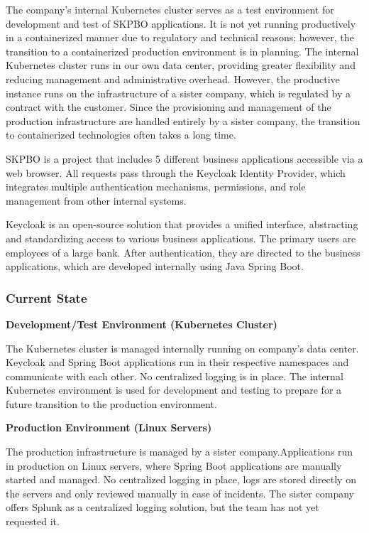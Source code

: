 \documentclass[../main.tex]{subfiles}
\begin{document}
The company's internal Kubernetes cluster serves as a test environment for development and test of SKPBO applications. It is not yet running productively in a containerized manner due to regulatory and technical reasons; however, the transition to a containerized production environment is in planning. The internal Kubernetes cluster runs in our own data center, providing greater flexibility and reducing management and administrative overhead. However, the productive instance runs on the infrastructure of a sister company, which is regulated by a contract with the customer. Since the provisioning and management of the production infrastructure are handled entirely by a sister company, the transition to containerized technologies often takes a long time.

SKPBO is a project that includes 5 different business applications accessible via a web browser. All requests pass through the Keycloak Identity Provider, which integrates multiple authentication mechanisms, permissions, and role management from other internal systems.

Keycloak is an open-source solution that provides a unified interface, abstracting and standardizing access to various business applications. The primary users are employees of a large bank. After authentication, they are directed to the business applications, which are developed internally using Java Spring Boot.

\subsubsection{Current State}

\textbf{Development/Test Environment (Kubernetes Cluster)}

The Kubernetes cluster is managed internally running on company's data center. Keycloak and Spring Boot applications run in their respective namespaces and communicate with each other. No centralized logging is in place. The internal Kubernetes environment is used for development and testing to prepare for a future transition to the production environment.

\textbf{Production Environment (Linux Servers)}

The production infrastructure is managed by a sister company.Applications run in production on Linux servers, where Spring Boot applications are manually started and managed. No centralized logging in place, logs are stored directly on the servers and only reviewed manually in case of incidents. The sister company offers Splunk as a centralized logging solution, but the team has not yet requested it.
\end{document}
